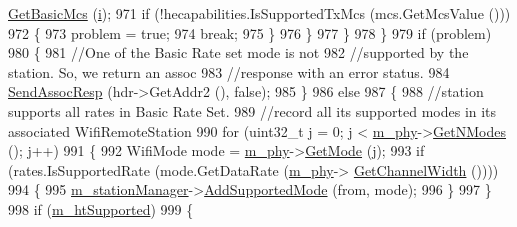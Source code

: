 \begin{DoxyCode}
      \hyperlink{classns3_1_1WifiRemoteStationManager_ad879e69f9470219a53c87de067bf2f40}{GetBasicMcs} (\hyperlink{bernuolliDistribution_8m_a6f6ccfcf58b31cb6412107d9d5281426}{i});
971                           \textcolor{keywordflow}{if} (!hecapabilities.IsSupportedTxMcs (mcs.GetMcsValue ()))
972                             \{
973                               problem = \textcolor{keyword}{true};
974                               \textcolor{keywordflow}{break};
975                             \}
976                         \}
977                     \}
978                 \}
979               \textcolor{keywordflow}{if} (problem)
980                 \{
981                   \textcolor{comment}{//One of the Basic Rate set mode is not}
982                   \textcolor{comment}{//supported by the station. So, we return an assoc}
983                   \textcolor{comment}{//response with an error status.}
984                   \hyperlink{classns3_1_1ApWifiMac_a0a36426da94f43b0a9136adf4e58f425}{SendAssocResp} (hdr->GetAddr2 (), \textcolor{keyword}{false});
985                 \}
986               \textcolor{keywordflow}{else}
987                 \{
988                   \textcolor{comment}{//station supports all rates in Basic Rate Set.}
989                   \textcolor{comment}{//record all its supported modes in its associated WifiRemoteStation}
990                   \textcolor{keywordflow}{for} (uint32\_t j = 0; j < \hyperlink{classns3_1_1RegularWifiMac_a1a6dad8eb0a057a4e1b459f518457a4c}{m\_phy}->\hyperlink{classns3_1_1WifiPhy_a2467e56b69d64bb2d648302f39397317}{GetNModes} (); j++)
991                     \{
992                       WifiMode mode = \hyperlink{classns3_1_1RegularWifiMac_a1a6dad8eb0a057a4e1b459f518457a4c}{m\_phy}->\hyperlink{classns3_1_1WifiPhy_ac35983a13a769a7fbaac43340b8cdaf2}{GetMode} (j);
993                       \textcolor{keywordflow}{if} (rates.IsSupportedRate (mode.GetDataRate (\hyperlink{classns3_1_1RegularWifiMac_a1a6dad8eb0a057a4e1b459f518457a4c}{m\_phy}->
      \hyperlink{classns3_1_1WifiPhy_a4a5d5009b3b3308f2baeed42a2007189}{GetChannelWidth} ())))
994                         \{
995                           \hyperlink{classns3_1_1RegularWifiMac_a76d1a5e27b64bfe36f24a55d1eea2775}{m\_stationManager}->\hyperlink{classns3_1_1WifiRemoteStationManager_a90f4d6b042c2692493446d36a3de799f}{AddSupportedMode} (from, mode);
996                         \}
997                     \}
998                   \textcolor{keywordflow}{if} (\hyperlink{classns3_1_1RegularWifiMac_a8950c44b8cf2ad1f9274821cf88adc7b}{m\_htSupported})
999                     \{

\end{DoxyCode}
